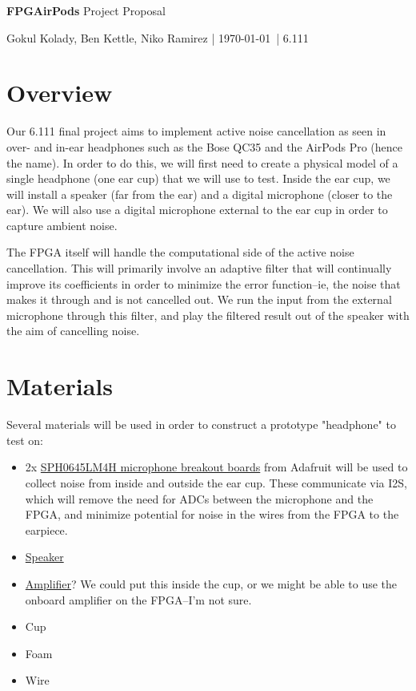 \documentclass[12pt]{article}
\begin{document}
{\Huge \textbf{FPGAirPods} Project Proposal}

\vspace{2mm}
{Gokul Kolady, Ben Kettle, Niko Ramirez | \today \ | 6.111}
\vspace{5mm}

\begin{multicols}{2}
\section{Overview}
Our 6.111 final project aims to implement active noise cancellation as seen in over- and in-ear headphones such as the Bose QC35 and the AirPods Pro (hence the name). In order to do this, we will first need to create a physical model of a single headphone (one ear cup) that we will use to test. Inside the ear cup, we will install a speaker (far from the ear) and a digital microphone (closer to the ear). We will also use a digital microphone external to the ear cup in order to capture ambient noise.

The FPGA itself will handle the computational side of the active noise cancellation. This will primarily involve an adaptive filter that will continually improve its coefficients in order to minimize the error function--ie, the noise that makes it through and is not cancelled out. We run the input from the external microphone through this filter, and play the filtered result out of the speaker with the aim of cancelling noise.

\section{Materials}
Several materials will be used in order to construct a prototype "headphone" to test on: 
\begin{itemize}
    \item 2x \href{https://www.adafruit.com/product/3421}{SPH0645LM4H microphone breakout boards} from Adafruit will be used to collect noise from inside and outside the ear cup. These communicate via I2S, which will remove the need for ADCs between the microphone and the FPGA, and minimize potential for noise in the wires from the FPGA to the earpiece.
    \item \href{https://www.adafruit.com/product/3968}{Speaker}
    \item \href{https://www.adafruit.com/product/3006}{Amplifier}? We could put this inside the cup, or we might be able to use the onboard amplifier on the FPGA--I'm not sure.
    \item Cup
    \item Foam
    \item Wire
\end{itemize}
\end{multicols}
\end{document}
